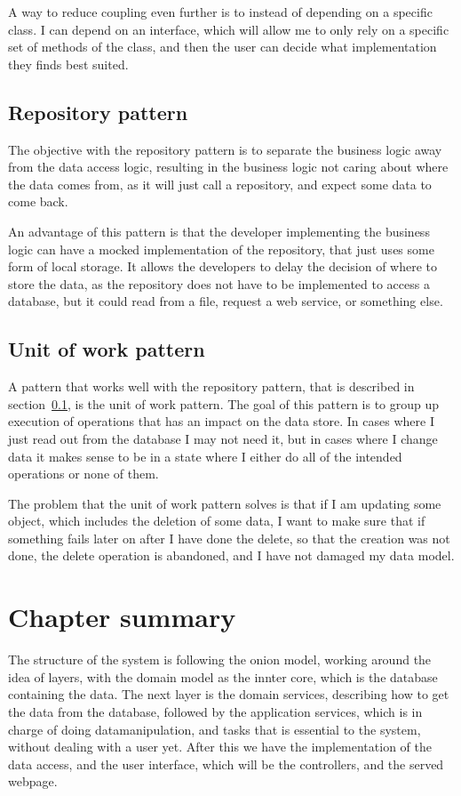 A way to reduce coupling even further is to instead of depending on a specific class. I can depend on an interface, which will allow me to only rely on a specific set of methods of the class, and then the user can decide what implementation they finds best suited.

\subsection{Repository pattern}
\label{sub:Repository pattern}
The objective with the repository pattern is to separate the business logic away from the data access logic, resulting in the business logic not caring about where the data comes from, as it will just call a repository, and expect some data to come back.

An advantage of this pattern is that the developer implementing the business logic can have a mocked implementation of the repository, that just uses some form of local storage. It allows the developers to delay the decision of where to store the data, as the repository does not have to be implemented to access a database, but it could read from a file, request a web service, or something else\cite{repository_pattern}.

\subsection{Unit of work pattern}
\label{sub:Unit of work pattern}
A pattern that works well with the repository pattern, that is described in section~\ref{sub:Repository pattern}, is the unit of work pattern. The goal of this pattern is to group up execution of operations that has an impact on the data store. In cases where I just read out from the database I may not need it, but in cases where I change data it makes sense to be in a state where I either do all of the intended operations or none of them.

The problem that the unit of work pattern solves is that if I am updating some object, which includes the deletion of some data, I want to make sure that if something fails later on after I have done the delete, so that the creation was not done, the delete operation is abandoned, and I have not damaged my data model\cite{uow}.

\section{Chapter summary}
The structure of the system is following the onion model, working around the
idea of layers, with the domain model as the innter core, which is the database
containing the data. The next layer is the domain services, describing how to
get the data from the database, followed by the application services, which is
in charge of doing datamanipulation, and tasks that is essential to the system,
without dealing with a user yet. After this we have the implementation of the
data access, and the user interface, which will be the controllers, and the
served webpage.

